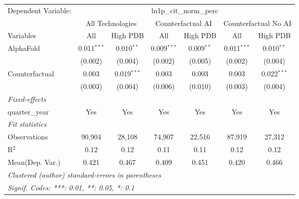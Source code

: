 \begingroup
\centering
\begin{tabular}{lcccccc}
   \tabularnewline \midrule \midrule
   Dependent Variable: & \multicolumn{6}{c}{ln1p\_cit\_norm\_perc}\\
 & \multicolumn{2}{c}{All Technologies} & \multicolumn{2}{c}{Counterfactual AI} & \multicolumn{2}{c}{Counterfactual No AI} \\
\cmidrule(lr){1-1}\cmidrule(lr){2-3} \cmidrule(lr){4-5} \cmidrule(lr){6-7}
Variables & \multicolumn{1}{c}{All} & \multicolumn{1}{c}{High PDB} & \multicolumn{1}{c}{All} & \multicolumn{1}{c}{High PDB} & \multicolumn{1}{c}{All} & \multicolumn{1}{c}{High PDB} \\
\cmidrule(lr){1-1}\cmidrule(lr){2-2} \cmidrule(lr){3-3} \cmidrule(lr){4-4} \cmidrule(lr){5-5} \cmidrule(lr){6-6} \cmidrule(lr){7-7}
   AlphaFold      & 0.011$^{***}$ & 0.010$^{**}$  & 0.009$^{***}$ & 0.009$^{**}$ & 0.011$^{***}$ & 0.010$^{**}$\\   
                  & (0.002)       & (0.004)       & (0.002)       & (0.005)      & (0.002)       & (0.004)\\   
   Counterfactual & 0.003         & 0.019$^{***}$ & 0.003         & 0.003        & 0.003         & 0.022$^{***}$\\   
                  & (0.003)       & (0.004)       & (0.006)       & (0.010)      & (0.003)       & (0.004)\\   
   \midrule
   \emph{Fixed-effects}\\
   quarter\_year  & Yes           & Yes           & Yes           & Yes          & Yes           & Yes\\  
   \midrule
   \emph{Fit statistics}\\
   Observations   & 90,904        & 28,108        & 74,907        & 22,516       & 87,919        & 27,312\\  
   R$^2$          & 0.12          & 0.12          & 0.11          & 0.11         & 0.12          & 0.12\\  
Mean(Dep. Var.) & 0.421 & 0.467 & 0.409 & 0.451 & 0.420 & 0.466 \\
   \midrule \midrule
   \multicolumn{7}{l}{\emph{Clustered (author) standard-errors in parentheses}}\\
   \multicolumn{7}{l}{\emph{Signif. Codes: ***: 0.01, **: 0.05, *: 0.1}}\\
\end{tabular}
\par\endgroup
